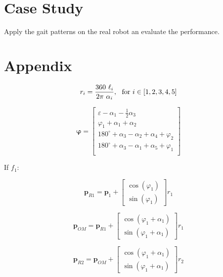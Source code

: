 \documentclass[10pt,a4paper]{article}
\begin{document}
\section{Case Study}

Apply the gait patterns on the real robot an evaluate the performance.



\clearpage
\appendix
\section{Appendix}

\begin{multicols}{2}

\begin{equation}
r_i = \frac{360 ~ \ell_i}{2 \pi ~ \alpha_i},~~ \textnormal{for}~ i \in [1,2,3,4,5]
\label{eq:F1_start}
\end{equation}

\begin{equation}
\bm{\varphi} = \begin{bmatrix}
\varepsilon - \alpha_1 - \frac{1}{2}\alpha_3 \\
\varphi_1 + \alpha_1 + \alpha_2 \\
180^\circ + \alpha_3 - \alpha_2 + \alpha_4 + \varphi_2 \\
180^\circ + \alpha_3 - \alpha_1 + \alpha_5 + \varphi_1 \\
\end{bmatrix}
\label{eq:phi_calc}
\end{equation}

If $f_1$:

\begin{equation}
\bm{p}_{R1} = \bm{p}_1 + 
\begin{bmatrix} 
\cos(\varphi_1)\\ 
\sin(\varphi_1)\end{bmatrix} r_1
\end{equation}

\begin{equation}
\bm{p}_{OM} = \bm{p}_{R1} + \begin{bmatrix} 
\cos(\varphi_1 + \alpha_1) \\ 
\sin(\varphi_1 + \alpha_1)
\end{bmatrix} r_1
\end{equation}

\begin{equation}
\bm{p}_{R2} = \bm{p}_{OM} + 
\begin{bmatrix} 
\cos(\varphi_1 + \alpha_1) \\ 
\sin(\varphi_1 + \alpha_1)
\end{bmatrix} r_2
\end{equation}


\end{multicols}
\end{document}
